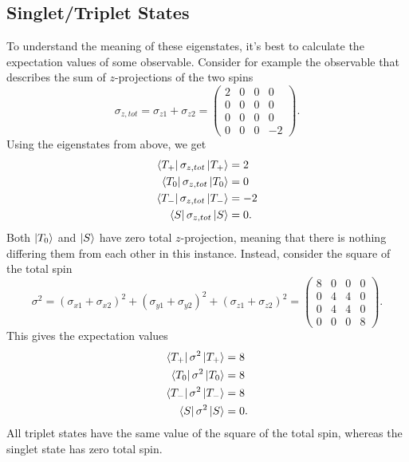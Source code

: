 \documentclass{article}
\begin{document}
\subsection{Singlet/Triplet States}
To understand the meaning of these eigenstates, it's best to calculate the expectation values of some observable. Consider for example the observable that describes the sum of $z$-projections of the two spins
\[
    \sigma _{z,tot}=\sigma _{z1}+\sigma _{z 2}=\begin{pmatrix}
    2&0&0&0\\
    0&0&0&0\\
    0&0&0&0\\
    0&0&0&-2
    \end{pmatrix}.
\]
Using the eigenstates from above, we get
\begin{align*}
    \bra{T_+}\sigma _{z,tot}\ket{T_+} &= 2\\
    \bra{T_0}\sigma _{z,tot}\ket{T_{0}}&=0\\
    \bra{T_-}\sigma _{z,tot}\ket{T_-}&=-2\\
    \bra{S}\sigma _{z,tot}\ket{S}&= 0.
\end{align*}
Both $\ket{T_0}$ and $\ket{S}$ have zero total $z$-projection, meaning that there is nothing differing them from each other in this instance. Instead, consider the square of the total spin
\[
    \sigma^2=(\sigma _{x1}+\sigma _{x 2})^2+\left( \sigma _{y1}+\sigma _{y 2} \right)^2 +\left( \sigma _{z1}+\sigma _{z 2} \right)^2=\begin{pmatrix}
        8&0&0&0\\
        0&4&4&0\\
        0&4&4&0\\
        0&0&0&8
    \end{pmatrix}.
\]
This gives the expectation values
\begin{align*}
    \bra{T_+}\sigma^2 \ket{T_+} &= 8\\
    \bra{T_0}\sigma^2 \ket{T_0} &= 8\\
    \bra{T_-}\sigma^2 \ket{T_-} &=8\\
    \bra{S}\sigma^2 \ket{S}&=0.
\end{align*}
All triplet states have the same value of the square of the total spin, whereas the singlet state has zero total spin.
\end{document}

